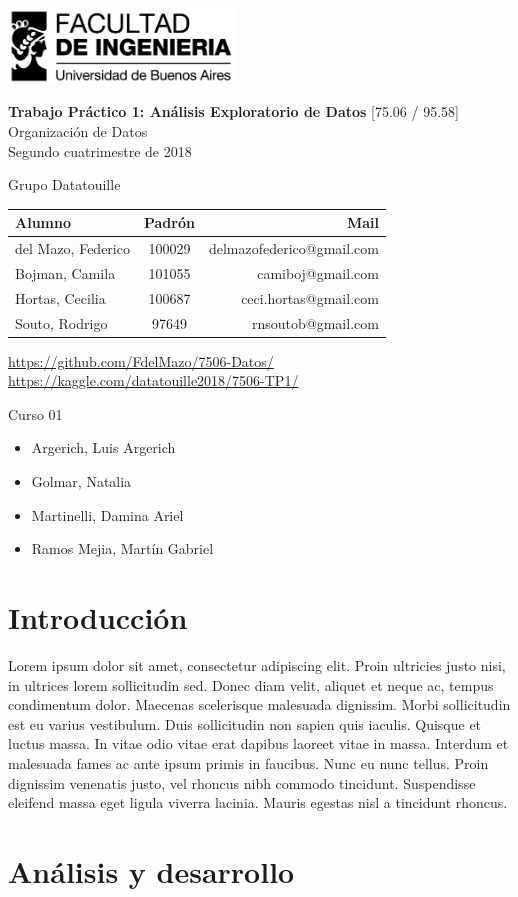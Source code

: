 \documentclass[a4paper]{article}
\makeatletter
\newcommand{\materia}{[75.06 / 95.58] Organización de Datos}
\newcommand{\trabajo}{Trabajo Práctico 1: Análisis Exploratorio de Datos}
\newcommand{\cuatrimestre}{Segundo cuatrimestre de 2018}
\newcommand{\grupo}{Grupo Datatouille}
\newcommand{\repo}{https://github.com/FdelMazo/7506-Datos/}
\newcommand{\kernel}{https://kaggle.com/datatouille2018/7506-TP1/}
\newcommand{\alumnos}{
    del Mazo, Federico & 100029 & delmazofederico@gmail.com\\
    Bojman, Camila & 101055 &  camiboj@gmail.com\\
    Hortas, Cecilia & 100687 & ceci.hortas@gmail.com\\
    Souto, Rodrigo & 97649 & rnsoutob@gmail.com\\
}
\newcommand{\curso}{Curso 01}
\newcommand{\docentes}{
    \item Argerich, Luis Argerich
    \item Golmar, Natalia
    \item Martinelli, Damina Ariel
    \item Ramos Mejia, Martín Gabriel
}
\makeatother
\begin{document}

\begin{titlepage}
	\hfill\includegraphics[width=6cm]{fiuba.jpg}
    \begin{center}
    \vfill
    \Huge \textbf{\trabajo}
    \vskip2cm
    \Large \materia\\
    \cuatrimestre
    \vfill
    \begin{flushleft} 
    \grupo
    \end{flushleft}
    \begin{tabular}{|l|c|r|}
	\hline
	Alumno & Padrón & Mail\\
	\hline \hline
    \alumnos
	\hline
	\end{tabular}
    \begin{flushleft} 
    \url{\repo} \\
    \url{\kernel}
    \end{flushleft}
    \vskip1cm
    \end{center}
    \curso
    \begin{itemize}
        \docentes
    \end{itemize}
\end{titlepage}
\tableofcontents
\newpage
{}
\setcounter{page}{1}

\section{Introducción}

 Lorem ipsum dolor sit amet, consectetur adipiscing elit. Proin ultricies justo nisi, in ultrices lorem sollicitudin sed. Donec diam velit, aliquet et neque ac, tempus condimentum dolor. Maecenas scelerisque malesuada dignissim. Morbi sollicitudin est eu varius vestibulum. Duis sollicitudin non sapien quis iaculis. Quisque et luctus massa. In vitae odio vitae erat dapibus laoreet vitae in massa. Interdum et malesuada fames ac ante ipsum primis in faucibus. Nunc eu nunc tellus. Proin dignissim venenatis justo, vel rhoncus nibh commodo tincidunt. Suspendisse eleifend massa eget ligula viverra lacinia. Mauris egestas nisl a tincidunt rhoncus. 

\section{Análisis y desarrollo}
\end{document}
